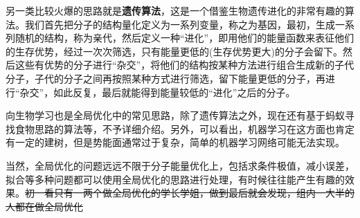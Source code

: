 \documentclass[12pt,a4paper,openany,twoside]{book}
\numberwithin{equation}{section}
\begin{document}
      另一类比较火爆的思路就是\textbf{遗传算法}，这是一个借鉴生物遗传进化的非常有趣的算法。我们首先把分子的结构量化定义为一系列变量，称之为基因，最初，生成一系列随机的结构，称为亲代，然后定义一种“进化”，即用他们的能量函数来表征他们的生存优势，经过一次次筛选，只有能量更低的(生存优势更大)的分子会留下。然后这些有优势的分子进行“杂交”，将他们的结构按某种方法进行组合生成新的子代分子，子代的分子之间再按照某种方式进行筛选，留下能量更低的分子，再进行“杂交”，如此反复，最后就能得到能量较低的“进化”之后的分子。

      向生物学习也是全局优化中的常见思路，除了遗传算法之外，现在还有基于蚂蚁寻找食物思路的算法等，不予详细介绍。另外，可以看出，机器学习在这方面也肯定有一定的建树，但是势能面通常过于复杂，简单的机器学习网络可能无法实现。

      当然，全局优化的问题远远不限于分子能量优化上，包括求条件极值，减小误差，拟合等多种问题都可以使用全局优化的思路进行处理，有时候往往能产生有趣的效果。\sout{初一看只有一两个做全局优化的学长学姐，做到最后就会发现，组内一大半的人都在做全局优化}
\end{document}

